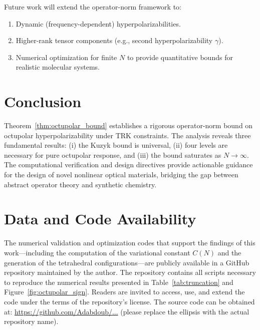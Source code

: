 \documentclass[11pt]{article}
\begin{document}
Future work will extend the operator-norm framework to:
\begin{enumerate}
    \item Dynamic (frequency-dependent) hyperpolarizabilities.
    \item Higher-rank tensor components (e.g., second hyperpolarizability $\gamma$).
    \item Numerical optimization for finite $N$ to provide quantitative bounds for realistic molecular systems.
\end{enumerate}

\section{Conclusion}

Theorem~\ref{thm:octupolar_bound} establishes a rigorous operator-norm bound on octupolar hyperpolarizability under TRK constraints. The analysis reveals three fundamental results: (i) the Kuzyk bound is universal, (ii) four levels are necessary for pure octupolar response, and (iii) the bound saturates as $N \to \infty$. The computational verification and design directives provide actionable guidance for the design of novel nonlinear optical materials, bridging the gap between abstract operator theory and synthetic chemistry.

\section*{Data and Code Availability}

The numerical validation and optimization codes that support the findings of this work—including the computation of the variational constant $C(N)$ and the generation of the tetrahedral configurations—are publicly available in a GitHub repository maintained by the author. The repository contains all scripts necessary to reproduce the numerical results presented in Table~\ref{tab:truncation} and Figure~\ref{fig:octupolar_sign}. Readers are invited to access, use, and extend the code under the terms of the repository's license. The source code can be obtained at: \url{https://github.com/Adabdoub/...} (please replace the ellipsis with the actual repository name).
\end{document}
